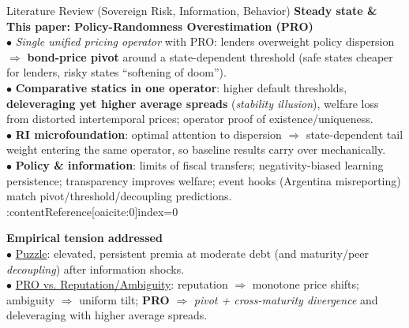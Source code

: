 \documentclass[aspectratio=169]{beamer}
\begin{document}
\begin{frame}{Literature Review (Sovereign Risk, Information, Behavior)}
\vspace{0.8em}
\textbf{Steady state \& This paper: Policy-Randomness Overestimation (PRO)} \\
\quad $\bullet$ \emph{Single unified pricing operator} with PRO: lenders overweight policy dispersion $\Rightarrow$ \textbf{bond-price pivot} around a state-dependent threshold (safe states cheaper for lenders, risky states ``softening of doom''). \\
\quad $\bullet$ \textbf{Comparative statics in one operator}: higher default thresholds, \textbf{deleveraging yet higher average spreads} (\emph{stability illusion}), welfare loss from distorted intertemporal prices; operator proof of existence/uniqueness. \\
\quad $\bullet$ \textbf{RI microfoundation}: optimal attention to dispersion $\Rightarrow$ state-dependent tail weight entering the same operator, so baseline results carry over mechanically. \\
\quad $\bullet$ \textbf{Policy \& information}: limits of fiscal transfers; negativity-biased learning persistence; transparency improves welfare; event hooks (Argentina misreporting) match pivot/threshold/decoupling predictions. 
{\scriptsize {} \;:contentReference[oaicite:0]{index=0}}

\vspace{0.6em}
\textbf{Empirical tension addressed} \\
\quad $\bullet$ \underline{Puzzle}: elevated, persistent premia at moderate debt (and maturity/peer \emph{decoupling}) after information shocks. \\
\quad $\bullet$ \underline{PRO vs. Reputation/Ambiguity}: reputation $\Rightarrow$ monotone price shifts; ambiguity $\Rightarrow$ uniform tilt; \textbf{PRO} $\Rightarrow$ \emph{pivot + cross-maturity divergence} and deleveraging with higher average spreads.

\end{frame}
\end{document}
